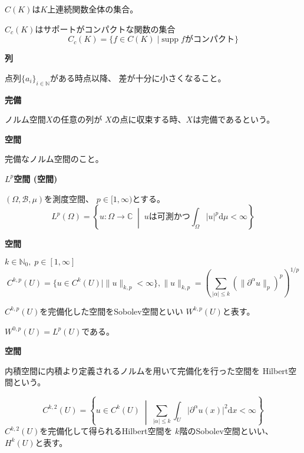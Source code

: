 \documentclass[12pt,b5paper]{ltjsarticle}
\begin{document}
\hrulefill

$C(K)$は$K$上連続関数全体の集合。

$C_{c}(K)$はサポートがコンパクトな関数の集合
\begin{equation}
 C_{c}(K) = \{f\in C(K) \mid \mathrm{supp}\;f がコンパクト\}
\end{equation}

\textbf{列}

点列$\{a_{i}\}_{i\in\mathbb{N}}$がある時点以降、
差が十分に小さくなること。


\textbf{完備}

ノルム空間$X$の任意の列が
$X$の点に収束する時、$X$は完備であるという。

\textbf{空間}

完備なノルム空間のこと。

\textbf{$L^{p}$空間 (空間)}

$(\Omega,\mathcal{B},\mu)$を測度空間、
$p\in [1,\infty)$とする。
\begin{equation}
 L^{p}(\Omega) =
  \left\{
   u:\Omega\to\mathbb{C} \; \middle| \; uは可測かつ \int_{\Omega} \lvert u \rvert^{p}\mathrm{d}\mu < \infty
  \right\}
\end{equation}



\textbf{空間}

$k\in\mathbb{N}_{0}, \; p\in [1,\infty]$
\begin{equation}
 C^{k,p}(U) = \{ u\in C^{k}(U) \mid \|u\|_{k,p} < \infty\}
  , \|u\|_{k,p} = \left(\sum_{\lvert \alpha \rvert \leq k} (\|\partial^{\alpha}u\|_{p})^{p}\right)^{1/p}
\end{equation}

$C^{k,p}(U)$を完備化した空間をSobolev空間といい
$W^{k,p}(U)$と表す。

$W^{0,p}(U)=L^{p}(U)$である。



\textbf{空間}

内積空間に内積より定義されるノルムを用いて完備化を行った空間を
Hilbert空間という。

\begin{equation}
 C^{k,2}(U) = \left\{ u\in C^{k}(U) \; \middle| \; \sum_{\lvert \alpha \rvert\leq k}\int_{U}\lvert \partial^{\alpha}u(x) \rvert^{2}\mathrm{d}x < \infty \right\}
\end{equation}
$C^{k,2}(U)$を完備化して得られるHilbert空間を
$k$階のSobolev空間といい、$H^{k}(U)$と表す。
\end{document}
